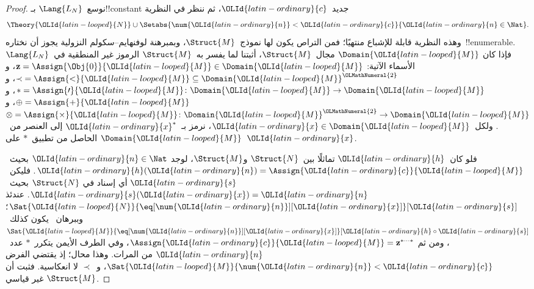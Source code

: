 \documentclass[../../../include/open-logic-section]{subfiles}
\begin{document}
\begin{proof}
نوسع~$\Lang{L_N}$ بـ!!{constant} جديد~${\OLId{latin-ordinary}{c}}$، ثم ننظر في النظرية
\[
\Theory{{\OLId{latin-looped}{N}}} \cup \Setabs{\num{{\OLId{latin-ordinary}{n}}} < {\OLId{latin-ordinary}{c}}}{{\OLId{latin-ordinary}{n}} \in \Nat}.
\]
وهذه النظرية قابلة للإشباع منتهيًا؛ فمن التراص يكون لها نموذج~$\Struct{M}$،
وبمبرهنة لوفنهايم--سكولم النزولية يجوز أن نختاره~!!{enumerable}. فإذا كان
$\Domain{{\OLId{latin-looped}{M}}}$ مجال~$\Struct{M}$، أثبتنا لما يفسر به~$\Struct{M}$ الرموز
غير المنطقية في~$\Lang{L_N}$ الأسماء الآتية:
$\mathbf{z} = \Assign{\Obj{0}}{{\OLId{latin-looped}{M}}} \in \Domain{{\OLId{latin-looped}{M}}}$، و
${\prec} = \Assign{<}{{\OLId{latin-looped}{M}}} \subseteq \Domain{{\OLId{latin-looped}{M}}}^{\OLMathNumeral{2}}$، و
$* = \Assign{\prime}{{\OLId{latin-looped}{M}}} \colon \Domain{{\OLId{latin-looped}{M}}} \to \Domain{{\OLId{latin-looped}{M}}}$، و
$\oplus = \Assign{+}{{\OLId{latin-looped}{M}}}$، و
$\otimes = \Assign{\times}{{\OLId{latin-looped}{M}}} \colon \Domain{{\OLId{latin-looped}{M}}}^{\OLMathNumeral{2}} \to \Domain{{\OLId{latin-looped}{M}}}$.
ولكل~${\OLId{latin-ordinary}{x}} \in \Domain{{\OLId{latin-looped}{M}}}$، نرمز بـ~${\OLId{latin-ordinary}{x}}^*$ إلى العنصر من~$\Domain{{\OLId{latin-looped}{M}}}$
الحاصل من تطبيق~$*$ على~${\OLId{latin-ordinary}{x}}$.

فلو كان~${\OLId{latin-ordinary}{h}}$ تماثلًا بين~$\Struct{N}$ و$\Struct{M}$، لوجد
${\OLId{latin-ordinary}{n}} \in \Nat$ بحيث~${\OLId{latin-ordinary}{h}}({\OLId{latin-ordinary}{n}}) = \Assign{{\OLId{latin-ordinary}{c}}}{{\OLId{latin-looped}{M}}}$. فليكن~${\OLId{latin-ordinary}{s}}$ أي إسناد في
$\Struct{N}$ بحيث~${\OLId{latin-ordinary}{s}}({\OLId{latin-ordinary}{x}}) = {\OLId{latin-ordinary}{n}}$. عندئذ
$\Sat{{\OLId{latin-looped}{N}}}{\eq[\num{{\OLId{latin-ordinary}{n}}}][{\OLId{latin-ordinary}{x}}]}[{\OLId{latin-ordinary}{s}}]$؛ وببرهان~ يكون
كذلك~$\Sat{{\OLId{latin-looped}{M}}}{\eq[\num{{\OLId{latin-ordinary}{n}}}][{\OLId{latin-ordinary}{x}}]}[{\OLId{latin-ordinary}{h}} \circ {\OLId{latin-ordinary}{s}}]$، ومن ثم
$\Assign{{\OLId{latin-ordinary}{c}}}{{\OLId{latin-looped}{M}}} = \mathbf{z}^{*\cdots *}$، وفي الطرف الأيمن يتكرر~$*$ عدد~${\OLId{latin-ordinary}{n}}$
من المرات. وهذا محال؛ إذ يقتضي الفرض
$\Sat{{\OLId{latin-looped}{M}}}{\num{{\OLId{latin-ordinary}{n}}} < {\OLId{latin-ordinary}{c}}}$، و~$\prec$ لا انعكاسية. فثبت أن
$\Struct{M}$ غير قياسي.
\end{proof}
\end{document}
